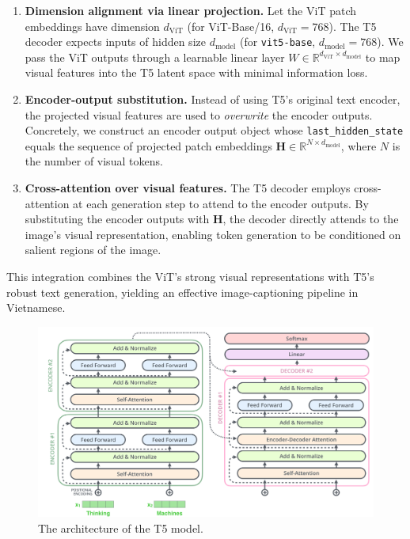 \begin{enumerate}
    \item \textbf{Dimension alignment via linear projection.} Let the ViT patch embeddings have dimension \(d_{\mathrm{ViT}}\) (for ViT-Base/16, \(d_{\mathrm{ViT}}{=}768\)). The T5 decoder expects inputs of hidden size \(d_{\mathrm{model}}\) (for \texttt{vit5-base}, \(d_{\mathrm{model}}{=}768\)). We pass the ViT outputs through a learnable linear layer \(W \in \mathbb{R}^{d_{\mathrm{ViT}} \times d_{\mathrm{model}}}\) to map visual features into the T5 latent space with minimal information loss.
    
    \item \textbf{Encoder-output substitution.} Instead of using T5’s original text encoder, the projected visual features are used to \emph{overwrite} the encoder outputs. Concretely, we construct an encoder output object whose \texttt{last\_hidden\_state} equals the sequence of projected patch embeddings \(\mathbf{H} \in \mathbb{R}^{N \times d_{\mathrm{model}}}\), where \(N\) is the number of visual tokens.
    
    \item \textbf{Cross-attention over visual features.} The T5 decoder employs cross-attention at each generation step to attend to the encoder outputs. By substituting the encoder outputs with \(\mathbf{H}\), the decoder directly attends to the image’s visual representation, enabling token generation to be conditioned on salient regions of the image.
\end{enumerate}

This integration combines the ViT’s strong visual representations with T5’s robust text generation, yielding an effective image-captioning pipeline in Vietnamese.



\begin{figure}[H]
  \centering
  \includegraphics[width=\textwidth]{image/transformer_residual_layer_norm_3.png}
  \caption{The architecture of the T5 model.}
  \label{fig:T5-architecture}
\end{figure}


